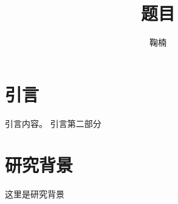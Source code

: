 \documentclass[Doctor]{BJTU-thesis}
\author{鞠楠}
\title{题目}
\begin{document}
	\makeAuthorization
	\makeInfo
	
	
	
	\tableofcontents
	\newpage{}
	\chapter{引言}
	引言内容。
	\newpage
	引言第二部分
	\chapter{研究背景}
	这里是研究背景
\end{document}
